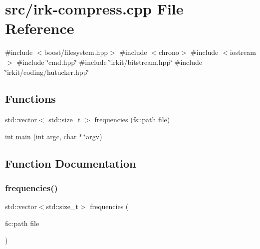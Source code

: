 \hypertarget{irk-compress_8cpp}{}\section{src/irk-\/compress.cpp File Reference}
\label{irk-compress_8cpp}
{\ttfamily \#include $<$boost/filesystem.\+hpp$>$}\newline
{\ttfamily \#include $<$chrono$>$}\newline
{\ttfamily \#include $<$iostream$>$}\newline
{\ttfamily \#include \char`\"{}cmd.\+hpp\char`\"{}}\newline
{\ttfamily \#include \char`\"{}irkit/bitstream.\+hpp\char`\"{}}\newline
{\ttfamily \#include \char`\"{}irkit/coding/hutucker.\+hpp\char`\"{}}\newline
\subsection*{Functions}
\begin{DoxyCompactItemize}
\item 
std\+::vector$<$ std\+::size\+\_\+t $>$ \mbox{\hyperlink{irk-compress_8cpp_a2cd80733ced3d7eda8a6de0389cccc73}{frequencies}} (fs\+::path file)
\item 
int \mbox{\hyperlink{irk-compress_8cpp_a3c04138a5bfe5d72780bb7e82a18e627}{main}} (int argc, char $\ast$$\ast$argv)
\end{DoxyCompactItemize}


\subsection{Function Documentation}
\mbox{\label{irk-compress_8cpp_a2cd80733ced3d7eda8a6de0389cccc73}} 
\subsubsection{\texorpdfstring{frequencies()}{frequencies()}}
{\footnotesize\ttfamily std\+::vector$<$std\+::size\+\_\+t$>$ frequencies (\begin{DoxyParamCaption}\item[{fs\+::path}]{file }\end{DoxyParamCaption})}


